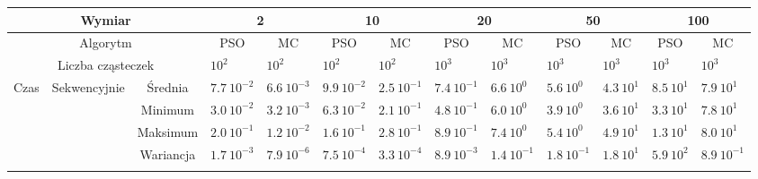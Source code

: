 \documentclass[11pt, a4paper, oneside]{article}
\begin{document}
\renewcommand{\arraystretch}{2}
\begin{table}[H]
\scriptsize
\begin{adjustwidth}{-1.76cm}{}
\centering
\begin{tabular}{|c|c|c|l|l|l|l|l|l|l|l|l|l|}
\hline
\multicolumn{3}{|c|}{Wymiar}                                      & \multicolumn{2}{c|}{2}                             & \multicolumn{2}{c|}{10}                            & \multicolumn{2}{c|}{20}                            & \multicolumn{2}{c|}{50}                            & \multicolumn{2}{c|}{100}                           \\ \hline
\multicolumn{3}{|c|}{Algorytm}                                    & \multicolumn{1}{c|}{PSO} & \multicolumn{1}{c|}{MC} & \multicolumn{1}{c|}{PSO} & \multicolumn{1}{c|}{MC} & \multicolumn{1}{c|}{PSO} & \multicolumn{1}{c|}{MC} & \multicolumn{1}{c|}{PSO} & \multicolumn{1}{c|}{MC} & \multicolumn{1}{c|}{PSO} & \multicolumn{1}{c|}{MC} \\ \hline
\multicolumn{3}{|c|}{Liczba cząsteczek}                           & $10^{2}$                 & $10^{2}$                & $10^{2}$                 & $10^{2}$                & $10^{3}$                 & $10^{3}$                & $10^{3}$                 & $10^{3}$                & $10^{3}$                 & $10^{3}$                \\ \hline
\multirow{8}{*}{Czas} & \multirow{4}{*}{Sekwencyjnie} & Średnia   & $7.7 \ 10^{-2}$          & $6.6 \ 10^{-3}$         & $9.9 \ 10^{-2}$          & $2.5 \ 10^{-1}$         & $7.4 \ 10^{-1}$          & $6.6 \ 10^{0}$          & $5.6 \ 10^{0}$           & $4.3 \ 10^{1}$          & $8.5 \ 10^{1}$           & $7.9 \ 10^{1}$          \\ \cline{3-13} 
                      &                               & Minimum   & $3.0 \ 10^{-2}$          & $3.2 \ 10^{-3}$         & $6.3 \ 10^{-2}$          & $2.1 \ 10^{-1}$         & $4.8 \ 10^{-1}$          & $6.0 \ 10^{0}$          & $3.9 \ 10^{0}$           & $3.6 \ 10^{1}$          & $3.3 \ 10^{1}$           & $7.8 \ 10^{1}$          \\ \cline{3-13} 
                      &                               & Maksimum  & $2.0 \ 10^{-1}$          & $1.2 \ 10^{-2}$         & $1.6 \ 10^{-1}$          & $2.8  \ 10^{-1}$        & $8.9 \ 10^{-1}$          & $7.4 \ 10^{0}$          & $5.4 \ 10^{0}$           & $4.9 \ 10^{1}$          & $1.3 \ 10^{1}$           & $8.0 \ 10^{1}$          \\ \cline{3-13} 
                      &                               & Wariancja & $1.7 \ 10^{-3}$          & $7.9 \ 10^{-6}$         & $7.5 \ 10^{-4}$          & $3.3 \ 10^{-4}$         & $8.9 \ 10^{-3}$          & $1.4 \ 10^{-1}$         & $1.8 \ 10^{-1}$          & $1.8 \ 10^{1}$          & $5.9 \ 10^{2}$           & $8.9 \ 10^{-1}$         \\ \cline{2-13} 

\end{tabular}
\end{adjustwidth}
\end{table}
\end{document}
